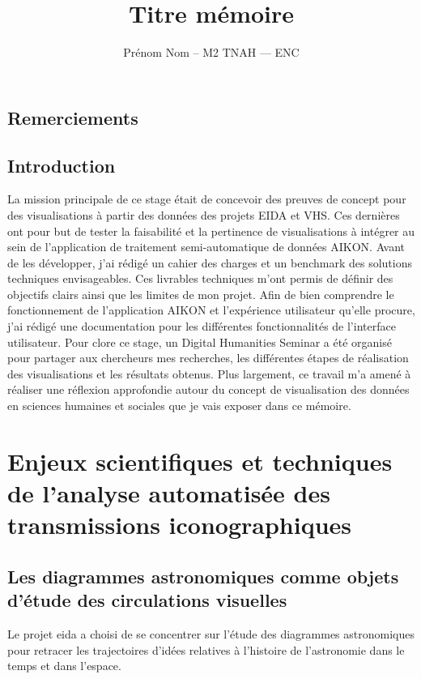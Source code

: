 \documentclass[a4paper,12pt,twoside]{book}
\author{Prénom Nom – M2 TNAH — ENC}
\title{Titre mémoire}
\newcommand\chapterNo[1]{
	\chapter*{#1}
	\markright{\MakeUppercase{#1}}
}
\begin{document}
	
	\onehalfspacing 
	
	\frontmatter
	
	
	
	\thispagestyle{empty}	
	\cleardoublepage
	
	
	
	\chapterNo{Remerciements}
	
	\chapterNo{Introduction}
	
	La mission principale de ce stage était de concevoir des preuves de concept pour des visualisations à partir des données des projets EIDA et VHS. Ces dernières ont pour but de tester la faisabilité et la pertinence de visualisations à intégrer au sein de l’application de traitement semi-automatique de données AIKON. Avant de les développer, j’ai rédigé un cahier des charges et un benchmark des solutions techniques envisageables. Ces livrables techniques m’ont permis de définir des objectifs clairs ainsi que les limites de mon projet. Afin de bien comprendre le fonctionnement de l’application AIKON et l’expérience utilisateur qu’elle procure, j’ai rédigé une documentation pour les différentes fonctionnalités de l’interface utilisateur. Pour clore ce stage, un Digital Humanities Seminar a été organisé pour partager aux chercheurs mes recherches, les différentes étapes de réalisation des visualisations et les résultats obtenus. Plus largement, ce travail m’a amené à réaliser une réflexion approfondie autour du concept de visualisation des données en sciences humaines et sociales que je vais exposer dans ce mémoire. 
	
	
	\thispagestyle{empty}
	\cleardoublepage
	
	\mainmatter
	
	\part{Enjeux scientifiques et techniques de l'analyse automatisée des transmissions iconographiques}
	\chapter[Les diagrammes astronomiques]{Les diagrammes astronomiques comme objets d'étude des circulations visuelles}
	
	Le projet \gls{eida} a choisi de se concentrer sur l'étude des diagrammes astronomiques pour retracer les trajectoires d'idées relatives à l'histoire de l'astronomie dans le temps et dans l'espace. 
	
\end{document}
